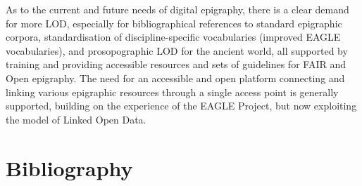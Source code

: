 \documentclass[
  10pt,
]{article}
\begin{document}
As to the current and future needs of digital epigraphy, there is a
clear demand for more LOD, especially for bibliographical references to
standard epigraphic corpora, standardisation of discipline-specific
vocabularies (improved EAGLE vocabularies), and prosopographic LOD for
the ancient world, all supported by training and providing accessible
resources and sets of guidelines for FAIR and Open epigraphy. The need
for an accessible and open platform connecting and linking various
epigraphic resources through a single access point is generally
supported, building on the experience of the EAGLE Project, but now
exploiting the model of Linked Open Data.

\hypertarget{bibliography}{%
\section{Bibliography}\label{bibliography}}
\end{document}
